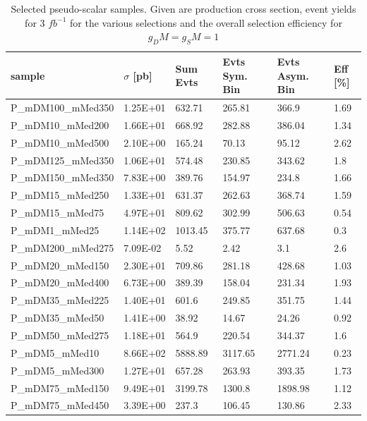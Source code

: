 \begin{table}[h]
\centering
\begin{tabular}{llllll}
\hline
sample             & $\sigma$ [pb] & Sum Evts       & Evts Sym. Bin & Evts Asym. Bin & Eff  [\%]   \\\hline
P\_mDM100\_mMed350 & 1.25E+01 & 632.71  & 265.81  & 366.9   & 1.69 \\
P\_mDM10\_mMed200  & 1.66E+01 & 668.92  & 282.88  & 386.04  & 1.34 \\
P\_mDM10\_mMed500  & 2.10E+00 & 165.24  & 70.13   & 95.12   & 2.62 \\
P\_mDM125\_mMed350 & 1.06E+01 & 574.48  & 230.85  & 343.62  & 1.8  \\
P\_mDM150\_mMed350 & 7.83E+00 & 389.76  & 154.97  & 234.8   & 1.66 \\
P\_mDM15\_mMed250  & 1.33E+01 & 631.37  & 262.63  & 368.74  & 1.59 \\
P\_mDM15\_mMed75   & 4.97E+01 & 809.62  & 302.99  & 506.63  & 0.54 \\
P\_mDM1\_mMed25    & 1.14E+02 & 1013.45 & 375.77  & 637.68  & 0.3  \\
P\_mDM200\_mMed275 & 7.09E-02 & 5.52    & 2.42    & 3.1     & 2.6  \\
P\_mDM20\_mMed150  & 2.30E+01 & 709.86  & 281.18  & 428.68  & 1.03 \\
P\_mDM20\_mMed400  & 6.73E+00 & 389.39  & 158.04  & 231.34  & 1.93 \\
P\_mDM35\_mMed225  & 1.40E+01 & 601.6   & 249.85  & 351.75  & 1.44 \\
P\_mDM35\_mMed50   & 1.41E+00 & 38.92   & 14.67   & 24.26   & 0.92 \\
P\_mDM50\_mMed275  & 1.18E+01 & 564.9   & 220.54  & 344.37  & 1.6  \\
P\_mDM5\_mMed10    & 8.66E+02 & 5888.89 & 3117.65 & 2771.24 & 0.23 \\
P\_mDM5\_mMed300   & 1.27E+01 & 657.28  & 263.93  & 393.35  & 1.73 \\
P\_mDM75\_mMed150  & 9.49E+01 & 3199.78 & 1300.8  & 1898.98 & 1.12 \\
P\_mDM75\_mMed450  & 3.39E+00 & 237.3   & 106.45  & 130.86  & 2.33 \\
\hline
\end{tabular}
\caption{Selected pseudo-scalar samples. Given are production cross section, event yields for 3 $fb^{-1 }$ for the various selections and the overall selection efficiency for $g_DM=g_SM=1$}
\label{tab:dm_P_g1_3fb}
\end{table}


